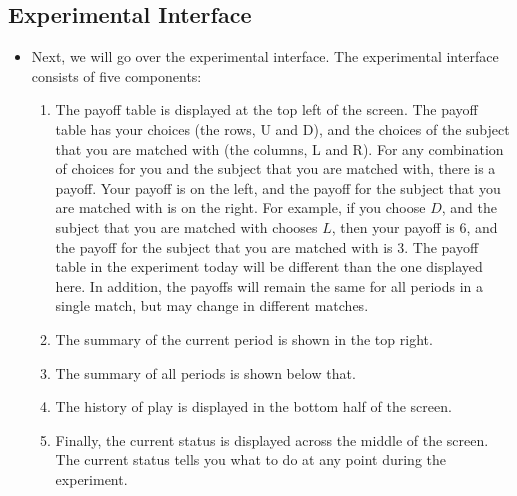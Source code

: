 \documentclass[11pt]{article}
\newcommand{\dblbkt}[1]{\ignorespaces}
\begin{document}
\subsection*{\dblbkt{6} Experimental Interface}
\begin{itemize}
\item Next, we will go over the experimental interface.  The experimental interface consists of five components: 
\begin{enumerate} 
\item \dblbkt{3} The payoff table is displayed at the top left of the screen.  The payoff table has your choices (the rows, \dblbkt{1} U and \dblbkt{1} D), and the choices of the subject that you are matched with (the columns, \dblbkt{1} L and \dblbkt{1} R).  For any combination of choices for you and the subject that you are matched with, there is a payoff.  Your payoff is on the left, and the payoff for the subject that you are matched with is on the right.  For example, if you \dblbkt{1} choose $D$, and the subject that you are matched with \dblbkt{1} chooses $L$, \dblbkt{1} then your payoff is 6, and \dblbkt{1} the payoff for the subject that you are matched with is 3.  The payoff table in the experiment today will be different than the one displayed here.  In addition, the payoffs will remain the same for all periods in a single match, but may change in different matches.
\item \dblbkt{3} The summary of the current period is shown in the top right. 
\item \dblbkt{1} The summary of all periods is shown below that.
\item \dblbkt{4} The history of play is displayed in the bottom half of the screen.
\item \dblbkt{4} Finally, the current status is displayed across the middle of the screen.  The current status tells you what to do at any point during the experiment.
\end{enumerate} 
\end{itemize}
\end{document}
